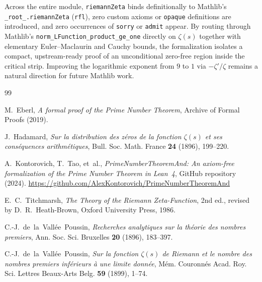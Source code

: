 \documentclass[11pt,a4paper]{article}
\theoremstyle{definition}
\begin{document}
Across the entire module, \texttt{riemannZeta} binds definitionally to Mathlib's \texttt{\_root\_.riemannZeta} (\texttt{rfl}), zero custom axioms or \texttt{opaque} definitions are introduced, and zero occurrences of \texttt{sorry} or \texttt{admit} appear. By routing through Mathlib's \texttt{norm\_LFunction\_\allowbreak product\_ge\_one} directly on $\zeta(s)$ together with elementary Euler--Maclaurin and Cauchy bounds, the formalization isolates a compact, upstream-ready proof of an unconditional zero-free region inside the critical strip. Improving the logarithmic exponent from $9$ to $1$ via $-\zeta'/\zeta$ remains a natural direction for future Mathlib work.

\begin{thebibliography}{99}
\raggedright

M.~Eberl, \emph{A formal proof of the Prime Number Theorem}, Archive of Formal Proofs (2019).

J.~Hadamard, \emph{Sur la distribution des z{\'e}ros de la fonction $\zeta(s)$ et ses cons{\'e}quences arithm{\'e}tiques}, Bull. Soc. Math. France \textbf{24} (1896), 199--220.

A.~Kontorovich, T.~Tao, et~al., \emph{PrimeNumberTheoremAnd: An axiom-free formalization of the Prime Number Theorem in Lean~4}, GitHub repository (2024). \url{https://github.com/AlexKontorovich/PrimeNumberTheoremAnd}

E.~C.~Titchmarsh, \emph{The Theory of the Riemann Zeta-Function}, 2nd ed., revised by D.~R.~Heath-Brown, Oxford University Press, 1986.

C.-J.~de~la~Vall{\'e}e~Poussin, \emph{Recherches analytiques sur la th{\'e}orie des nombres premiers}, Ann. Soc. Sci. Bruxelles \textbf{20} (1896), 183--397.

C.-J.~de~la~Vall{\'e}e~Poussin, \emph{Sur la fonction $\zeta(s)$ de Riemann et le nombre des nombres premiers inf{\'e}rieurs {\`a} une limite donn{\'e}e}, M{\'e}m. Couronn{\'e}s Acad. Roy. Sci. Lettres Beaux-Arts Belg. \textbf{59} (1899), 1--74.

\end{thebibliography}
\end{document}
